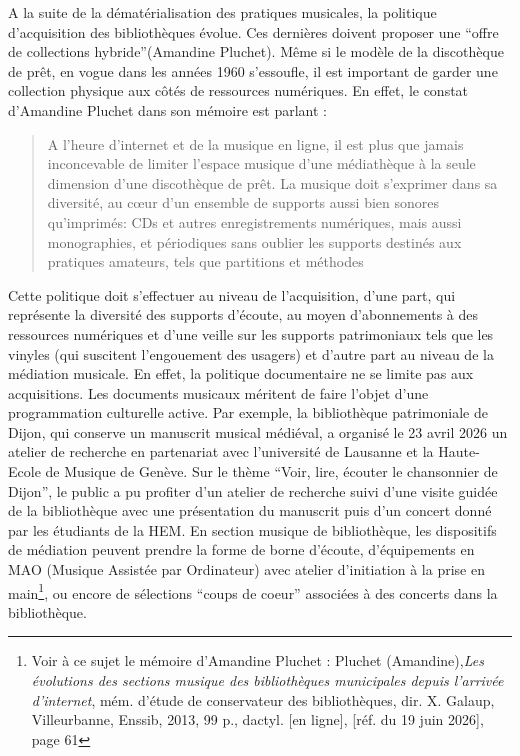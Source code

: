 A la suite de la dématérialisation des pratiques musicales, la politique d'acquisition des bibliothèques évolue. Ces dernières doivent proposer une \enquote{offre de collections hybride}(Amandine Pluchet). Même si le modèle de la discothèque de prêt, en vogue dans les années 1960 s'essoufle, il est important de garder une collection physique aux côtés de ressources numériques. 
En effet, le constat d'Amandine Pluchet dans son mémoire est parlant : 
\begin{quotation}
	{A l’heure d’internet et de la musique en ligne, il est plus que
	jamais inconcevable de limiter l’espace musique d’une médiathèque à la seule
	dimension d’une discothèque de prêt. La musique doit s’exprimer dans sa
	diversité, au cœur d’un ensemble de supports aussi bien sonores qu’imprimés:
	CDs et autres enregistrements numériques, mais aussi monographies, et
	périodiques sans oublier les supports destinés aux pratiques amateurs, tels que	partitions et méthodes
	}
\end{quotation}
 Cette politique doit s'effectuer au niveau de l'acquisition, d'une part, qui représente la diversité des supports d'écoute, au moyen d'abonnements à des ressources numériques et d'une veille sur les supports patrimoniaux tels que les vinyles (qui suscitent l'engouement des usagers) et d'autre part au niveau de la médiation musicale. En effet, la politique documentaire ne se limite pas aux acquisitions. Les documents musicaux méritent de faire l'objet d'une programmation culturelle active. 
Par exemple, la bibliothèque patrimoniale  de Dijon, qui conserve un manuscrit musical médiéval, a organisé le 23 avril 2026 un atelier de recherche en partenariat avec l'université de Lausanne et la Haute-Ecole de Musique de Genève. Sur le thème \enquote{Voir, lire, écouter le chansonnier de Dijon}, le public a pu profiter d'un  atelier de recherche suivi d'une visite guidée de la bibliothèque avec une présentation du manuscrit puis d'un concert donné par les étudiants de la HEM. 
En section musique de bibliothèque, les dispositifs de médiation peuvent prendre la forme de borne d'écoute, d'équipements en MAO (Musique Assistée par Ordinateur) avec atelier d'initiation à la prise en main\footnote{Voir à ce sujet le mémoire d'Amandine Pluchet : Pluchet (Amandine),\textit{Les évolutions des sections musique des bibliothèques municipales depuis l’arrivée d’internet}, mém. d'étude de conservateur des bibliothèques, dir. X. Galaup, Villeurbanne, Enssib, 2013, 99 p., dactyl. [en ligne], [réf. du 19 juin 2026], page 61}, ou encore de sélections \enquote{coups de coeur} associées à des concerts dans la bibliothèque. 



